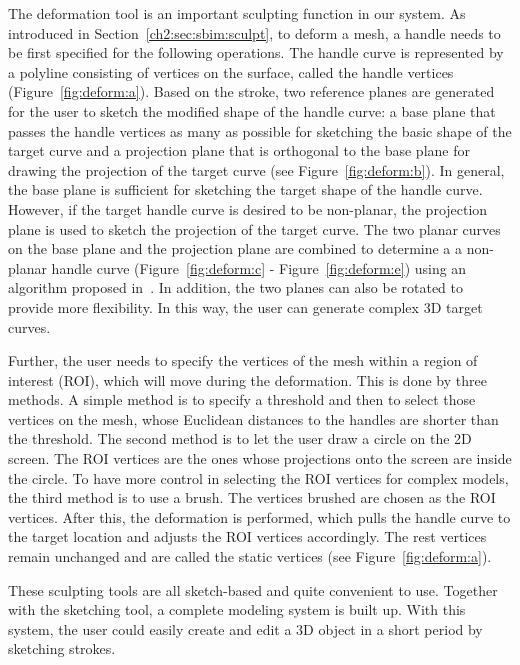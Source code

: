 The deformation tool is an important  sculpting function in our
system. As introduced in Section~\ref{ch2:sec:sbim:sculpt}, to
deform a mesh, a handle needs to be first specified for the
following operations. The handle curve is represented by a polyline
consisting of vertices on the surface, called the handle vertices
(Figure~\ref{fig:deform:a}). Based on the stroke, two reference
planes are generated for the user to sketch the modified shape of
the handle curve: a base plane that passes the handle vertices as
many as possible for sketching the basic shape of the target curve
and a projection plane that is orthogonal to the base plane for
drawing the projection of the target curve (see
Figure~\ref{fig:deform:b}). In general, the base plane is sufficient
for sketching the target shape of the handle curve. However, if the
target handle curve is desired to be non-planar, the projection
plane is used to sketch the projection of the target curve. The two
planar curves on the base plane and the projection plane are
combined to determine a a non-planar handle curve
(Figure~\ref{fig:deform:c} - Figure~\ref{fig:deform:e}) using an
algorithm proposed in~\cite{CMZHB99}. In addition,  the two planes
can also be rotated to provide more flexibility. In this way, the
user can generate complex 3D target curves.

Further, the user needs to specify the vertices of the mesh within a
region of interest (ROI), which will move during the deformation.
This is done by three methods. A simple method is to specify a
threshold and  then to select those vertices on the mesh, whose
Euclidean distances to the handles are shorter than the threshold.
The second method is to let the user draw a circle on the 2D screen.
The ROI vertices are the ones whose projections onto the screen are
inside the circle. To have more control in selecting the ROI
vertices for complex models, the third method is to use a brush. The
vertices brushed are chosen as the ROI vertices. After this, the
deformation is performed, which pulls the handle curve to the target
location and adjusts the ROI vertices accordingly. The rest vertices
remain unchanged and are called the static vertices (see
Figure~\ref{fig:deform:a}).

These sculpting tools are all sketch-based and quite convenient to
use. Together with the sketching tool, a complete modeling system is
built up. With this system, the user could easily create and edit a
3D object in a short period by sketching strokes.


